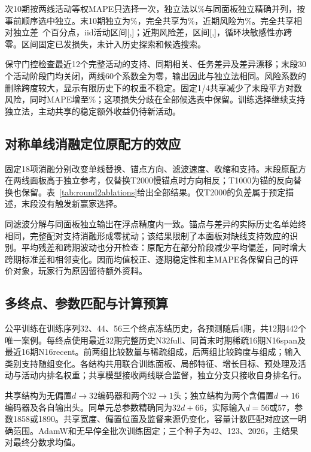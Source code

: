 次10期按两线活动等权MAPE只选择一次，独立法以\RSIndependent\%与同面板独立精确并列，按事前顺序选中独立。末10期独立为\RTIndependent\%，完全共享为\RTPool\%，近期风险为\RTRisk\%。完全共享相对独立差\RTPoolDelta\ 个百分点，iid活动区间[\RTPoolLow,\RTPoolHigh]；近期风险差\RTRiskDelta，区间[\RTRiskLow,\RTRiskHigh]，循环块敏感性亦跨零。区间固定已发损失，未计入历史探索和候选搜索。

保守门控检查最近12个完整活动的支持、同期相关、任务差异及差异漂移；末段30个活动阶段门均关闭，两线60个系数全为零，输出因此与独立法相同。风险系数的删除跨度较大，显示有限历史下的权重不稳定。固定1/4共享减少了末段平方对数风险，同时MAPE增至\RTQuarter\%；这项损失分歧在全部候选表中保留。训练选择继续支持独立法，主动共享的稳定额外收益仍待新活动。

\subsection{对称单线消融定位原配方的效应}
固定18项消融分别改变单线替换、锚点方向、滤波速度、收缩和支持。末段原配方在两线面板高于独立参考，仅替换T2000慢锚点时方向相反；T1000为锚的反向替换也保留。表~\ref{tab:round2ablations}给出全部结果。仅T2000的负差属于预定描述，末段没有触发新赢家选择。

同滤波分解与同面板独立输出在浮点精度内一致。锚点与差异的实际历史名单始终相同，完整配对支持消融形成零扰动；该结果限制了本面板对缺线支持效应的识别。平均残差和跨期波动也分开检查：原配方在部分阶段减少平均偏差，同时增大跨期标准差和相邻变化。因而均值校正、逐期稳定性和主MAPE各保留自己的评价对象，玩家行为原因留待额外资料。

\subsection{多终点、参数匹配与计算预算}
公平训练在训练序列32、44、56三个终点冻结历史，各预测随后4期，共12期442个唯一案例。每终点使用最近32期完整历史N32full、同首末时期稀疏16期N16span及最近16期N16recent。前两组比较数量与稀疏组成，后两组比较跨度与组成；输入类别支持随组变化。各结构共用联合训练面板、局部特征、增长目标、预处理及活动与活动内排名权重；共享模型接收两线联合监督，独立分支只接收自身排名行。

共享结构为无偏置\(d\to32\)编码器和两个\(32\to1\)头；独立结构为两个含偏置\(d\to16\)编码器及各自输出头。同单元总参数精确同为\(32d+66\)，实际输入\(d=56\)或57，参数1858或1890。共享宽度、偏置位置及监督来源仍变化，容量计数匹配对应这一明确范围。AdamW和无早停全批次训练固定；三个种子为42、123、2026，主结果对最终分数求均值。

